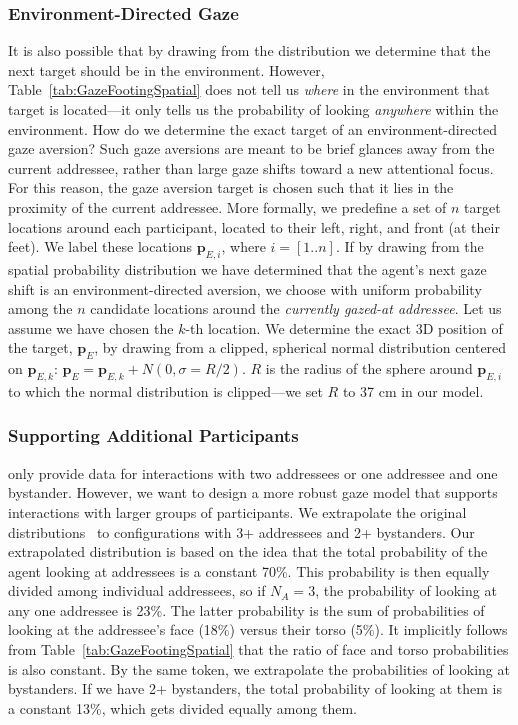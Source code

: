 \subsubsection{Environment-Directed Gaze}

It is also possible that by drawing from the distribution we determine that the next target should be in the environment. However, Table~\ref{tab:GazeFootingSpatial} does not tell us \emph{where} in the environment that target is located---it only tells us the probability of looking \emph{anywhere} within the environment. How do we determine the exact target of an environment-directed gaze aversion? Such gaze aversions are meant to be brief glances away from the current addressee, rather than large gaze shifts toward a new attentional focus. For this reason, the gaze aversion target is chosen such that it lies in the proximity of the current addressee. More formally, we predefine a set of $n$ target locations around each participant, located to their left, right, and front (at their feet). We label these locations $\mathbf{p}_{E,i}$, where $i = [1..n]$. If by drawing from the spatial probability distribution we have determined that the agent's next gaze shift is an environment-directed aversion, we choose with uniform probability among the $n$ candidate locations around the \emph{currently gazed-at addressee}. Let us assume we have chosen the $k$-th location. We determine the exact 3D position of the target, $\mathbf{p}_E$, by drawing from a clipped, spherical normal distribution centered on $\mathbf{p}_{E,k}$: $\mathbf{p}_E = \mathbf{p}_{E,k} + N(0, \sigma = R/2)$. $R$ is the radius of the sphere around $\mathbf{p}_{E,i}$ to which the normal distribution is clipped---we set $R$ to 37 cm in our model.

\subsubsection{Supporting Additional Participants}

\citet{mutlu2012conversational} only provide data for interactions with two addressees or one addressee and one bystander. However, we want to design a more robust gaze model that supports interactions with larger groups of participants. We extrapolate the original distributions~\citep{mutlu2012conversational} to configurations with 3+ addressees and 2+ bystanders. Our extrapolated distribution is based on the idea that the total probability of the agent looking at addressees is a constant 70\%. This probability is then equally divided among individual addressees, so if $N_A = 3$, the probability of looking at any one addressee is 23\%. The latter probability is the sum of probabilities of looking at the addressee's face (18\%) versus their torso (5\%). It implicitly follows from Table~\ref{tab:GazeFootingSpatial} that the ratio of face and torso probabilities is also constant. By the same token, we extrapolate the probabilities of looking at bystanders. If we have 2+ bystanders, the total probability of looking at them is a constant 13\%, which gets divided equally among them.

